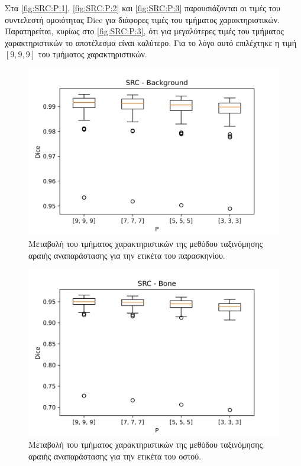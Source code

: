 \documentclass[a4paper,12pt]{article}
\begin{document}
Στα \autoref{fig:SRC:P:1}, \autoref{fig:SRC:P:2} και \autoref{fig:SRC:P:3}
παρουσιάζονται οι τιμές του συντελεστή ομοιότητας Dice για διάφορες τιμές του
τμήματος χαρακτηριστικών. Παρατηρείται, κυρίως στο \autoref{fig:SRC:P:3}, ότι
για μεγαλύτερες τιμές του τμήματος χαρακτηριστικών το αποτέλεσμα είναι καλύτερο.
Για το λόγο αυτό επιλέχτηκε η τιμή $[9,9,9]$ του τμήματος χαρακτηριστικών.

\begin{figure}[H]
    \centering
    \includegraphics[width=0.85\linewidth]{SRC_P_Background_plot.png}
    \caption{Μεταβολή του τμήματος χαρακτηριστικών της μεθόδου ταξινόμησης
             αραιής αναπαράστασης για την ετικέτα του παρασκηνίου.}
    \label{fig:SRC:P:1}
\end{figure}

\begin{figure}[H]
    \centering
    \includegraphics[width=0.85\linewidth]{SRC_P_Bone_plot.png}
    \caption{Μεταβολή του τμήματος χαρακτηριστικών της μεθόδου ταξινόμησης
             αραιής αναπαράστασης για την ετικέτα του οστού.}
    \label{fig:SRC:P:2}
\end{figure}
\end{document}
